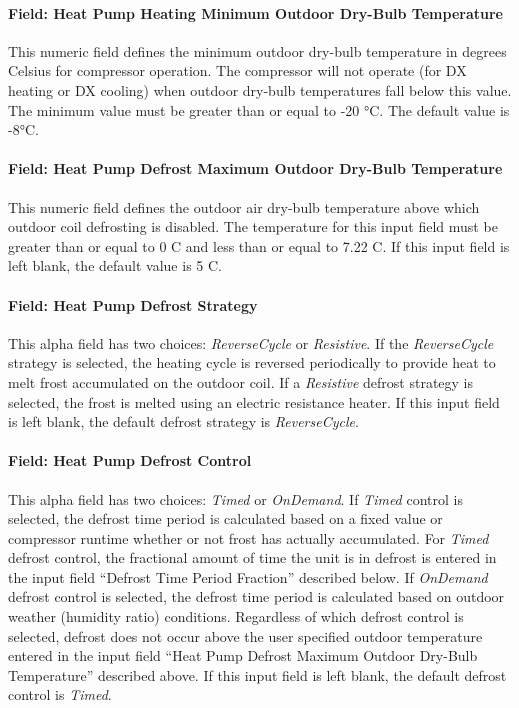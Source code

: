\paragraph{Field: Heat Pump Heating Minimum Outdoor Dry-Bulb Temperature}\label{field-heat-pump-heating-minimum-outdoor-dry-bulb-temperature-1}

This numeric field defines the minimum outdoor dry-bulb temperature in degrees Celsius for compressor operation. The compressor will not operate (for DX heating or DX cooling) when outdoor dry-bulb temperatures fall below this value. The minimum value must be greater than or equal to -20 °C. The default value is -8°C.

\paragraph{Field: Heat Pump Defrost Maximum Outdoor Dry-Bulb Temperature}\label{field-heat-pump-defrost-maximum-outdoor-dry-bulb-temperature-1}

This numeric field defines the outdoor air dry-bulb temperature above which outdoor coil defrosting is disabled. The temperature for this input field must be greater than or equal to 0 C and less than or equal to 7.22 C. If this input field is left blank, the default value is 5 C.

\paragraph{Field: Heat Pump Defrost Strategy}\label{field-heat-pump-defrost-strategy-1}

This alpha field has two choices: \emph{ReverseCycle} or \emph{Resistive}. If the \emph{ReverseCycle} strategy is selected, the heating cycle is reversed periodically to provide heat to melt frost accumulated on the outdoor coil. If a \emph{Resistive} defrost strategy is selected, the frost is melted using an electric resistance heater. If this input field is left blank, the default defrost strategy is \emph{ReverseCycle}.

\paragraph{Field: Heat Pump Defrost Control}\label{field-heat-pump-defrost-control-1}

This alpha field has two choices: \emph{Timed} or \emph{OnDemand}. If \emph{Timed} control is selected, the defrost time period is calculated based on a fixed value or compressor runtime whether or not frost has actually accumulated. For \emph{Timed} defrost control, the fractional amount of time the unit is in defrost is entered in the input field ``Defrost Time Period Fraction'' described below. If \emph{OnDemand} defrost control is selected, the defrost time period is calculated based on outdoor weather (humidity ratio) conditions. Regardless of which defrost control is selected, defrost does not occur above the user specified outdoor temperature entered in the input field ``Heat Pump Defrost Maximum Outdoor Dry-Bulb Temperature'' described above. If this input field is left blank, the default defrost control is \emph{Timed}.

